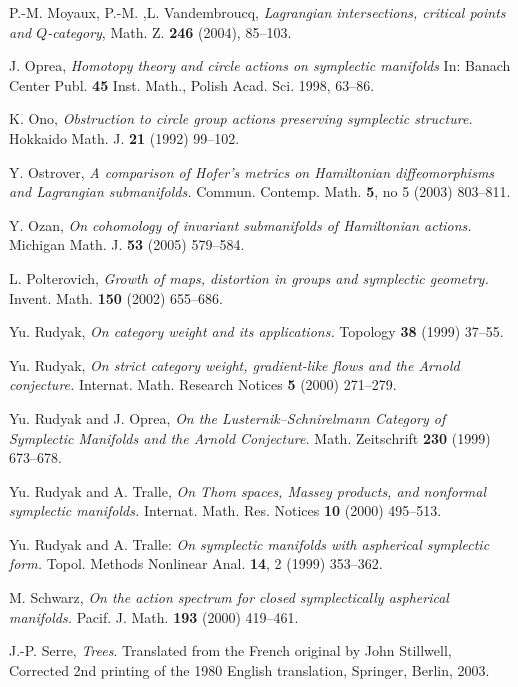 \documentclass[12pt]{amsart}
\numberwithin{equation}{section}
\theoremstyle{definition}
\theoremstyle{remark}
\numberwithin{figure}{section}
\numberwithin{table}{section}
\begin{document}
\begin{thebibliography}{ABCDE}
 P.-M. Moyaux, P.-M. ,L. Vandembroucq,
{\em Lagrangian intersections, critical points and $Q$-category}, Math. Z. {\bf 
246} (2004),  85--103. 

J. Oprea, {\em Homotopy theory and circle actions on symplectic manifolds} In:  
Banach Center Publ. {\bf 45} Inst. Math., Polish Acad. Sci. 1998, 63--86. 
 
K. Ono, {\em Obstruction to circle group actions preserving symplectic  
structure.} Hokkaido Math. J. {\bf 21} (1992)  99--102. 
 
Y. Ostrover, {\em A comparison of Hofer's metrics on Hamiltonian  
diffeomorphisms and Lagrangian submanifolds.}  
Commun. Contemp. Math.  \textbf{5}, no 5  (2003) 803--811. 
 
Y. Ozan, {\em On cohomology of invariant submanifolds of Hamiltonian actions.}  
Michigan Math. J. {\bf 53} (2005)  579--584. 
 
L. Polterovich, {\em Growth of maps, distortion in groups and symplectic  
geometry.} Invent. Math. {\bf 150} (2002) 655--686. 
 
Yu. Rudyak, {\em On category weight and its applications.}  Topology {\bf 38} (1999) 37--55.  
 
Yu. Rudyak, {\em On strict category weight, gradient-like flows and the Arnold  
conjecture.} Internat. Math. Research Notices {\bf 5} (2000) 271--279.  
 
Yu. Rudyak and  J. Oprea, {\em On the Lusternik--Schnirelmann Category of  
Symplectic Manifolds and the Arnold Conjecture.} Math. Zeitschrift {\bf 230}  
(1999) 673--678. 
 
Yu. Rudyak and A. Tralle, {\em On Thom spaces, Massey products, and 
nonformal symplectic manifolds.} Internat. Math. Res. Notices 
\textbf{10} (2000) 495--513. 
 
Yu. Rudyak and A. Tralle: {\em On symplectic manifolds with aspherical 
symplectic form.} Topol. Methods Nonlinear Anal. \textbf{14}, 2 (1999) 353--362. 
 
M. Schwarz, {\em On the action spectrum for closed symplectically 
aspherical manifolds.} Pacif. J. Math. {\bf 193} (2000) 419--461. 
 
J.-P. Serre, {\it Trees}. Translated from the French original by John Stillwell, 
Corrected 2nd printing of the 1980 English translation, Springer, Berlin, 2003. 
 

\end{thebibliography}
\end{document}
